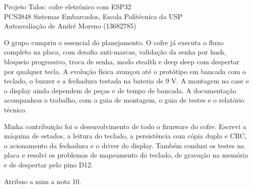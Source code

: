 \documentclass[11pt,a4paper]{article}
\begin{document}
\begin{center}
{\large Projeto Talos: cofre eletrônico com ESP32}\\[4pt]
PCS3848 Sistemas Embarcados, Escola Politécnica da USP\\[4pt]
Autoavaliação de André Moreno (13682785)
\end{center}
\vspace{0.6cm}

O grupo cumpriu o essencial do planejamento. O cofre já executa o fluxo completo na placa, com desafio anti-marcas, validação da senha por hash, bloqueio progressivo, troca de senha, modo stealth e deep sleep com despertar por qualquer tecla. A evolução física avançou até o protótipo em bancada com o teclado, o buzzer e a fechadura testada na bateria de 9 V. A montagem no case e o display ainda dependem de peças e de tempo de bancada. A documentação acompanhou o trabalho, com o guia de montagem, o guia de testes e o relatório técnico.

Minha contribuição foi o desenvolvimento de todo o firmware do cofre. Escrevi a máquina de estados, a leitura do teclado, a persistência com cópia dupla e CRC, o acionamento da fechadura e o driver do display. Também conduzi os testes na placa e resolvi os problemas de mapeamento do teclado, de gravação na memória e de despertar pelo pino D12.

Atribuo a mim a nota 10.
\end{document}
